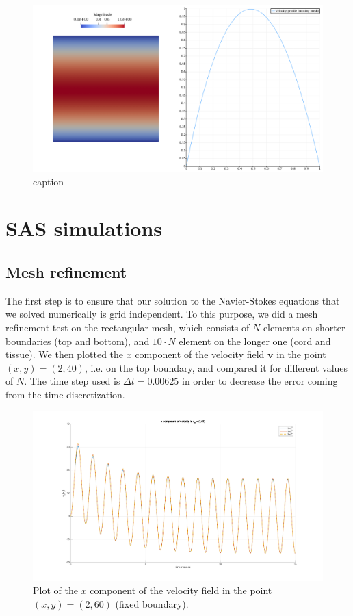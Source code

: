 \documentclass[a4paper,11pt,openright,twoside]{book}
\begin{document}
\begin{figure}[h!]
\centering
\includegraphics[width=\textwidth]{images/velocity_moving.png}
\caption{caption}
\end{figure}

\chapter{SAS simulations}

\section{Mesh refinement}
The first step is to ensure that our solution to the Navier-Stokes equations that we solved numerically is grid independent. To this purpose, we did a mesh refinement test on the rectangular mesh, which consists of $N$ elements on shorter boundaries (top and bottom), and $10 \cdot N$ element on the longer one (cord and tissue). We then plotted the $x$ component of the velocity field $\mathbf{v}$ in the point $(x,y) = (2, 40)$, i.e. on the top boundary, and compared it for different values of $N$. The time step used is $\Delta t = 0.00625$ in order to decrease the error coming from the time discretization. 

\begin{figure}[h!]
\centering
\includegraphics[width=\textwidth]{images/mesh_refinement.png}
\caption{Plot of the $x$ component of the velocity field in the point $(x,y)=(2,60)$ (fixed boundary).}
\label{img:sas:1}
\end{figure}
\end{document}
